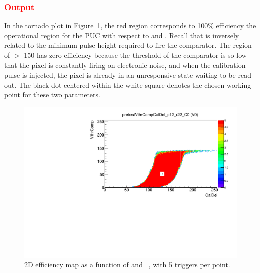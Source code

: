 \subsubsection{\textcolor{red}{Output}}

In the tornado plot in Figure~\ref{fig:tornado}, the red region corresponds to 100\% efficiency \textendash\xspace
the operational region for the PUC with respect to \vthrcomp and \caldel.
Recall that \vthrcomp is inversely related to the minimum pulse height required to fire the comparator.
The region of \vthrcomp $>$ 150 has zero efficiency because
the threshold of the comparator is so low that the pixel is constantly firing on electronic noise,
and when the calibration pulse is injected,
the pixel is already in an unresponsive state waiting to be read out.
The black dot centered within the white square denotes the chosen working point for these two parameters.

\begin{figure}[hbtp]
\begin{center}
\includegraphics[width=\textwidth]{figures/tornado_plot.pdf}
\caption{2D efficiency map as a function of \vthrcomp and \caldel~\dacs, with 5 triggers per point.}
\label{fig:tornado}
\end{center}
\end{figure}
